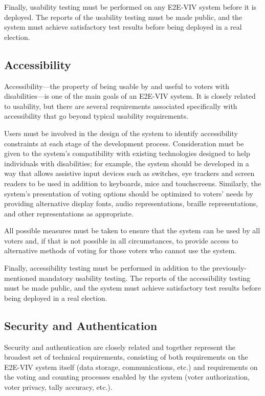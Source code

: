 Finally, usability testing must be performed on any E2E-VIV system
before it is deployed. The reports of the usability testing must be
made public, and the system must achieve satisfactory test results
before being deployed in a real election.

\subsection{Accessibility}

Accessibility---the property of being usable by and useful to voters
with disabilities---is one of the main goals of an E2E-VIV system. It
is closely related to usability, but there are several requirements
associated specifically with accessibility that go beyond typical
usability requirements.

Users must be involved in the design of the system to identify
accessibility constraints at each stage of the development
process. Consideration must be given to the system's compatibility
with existing technologies designed to help individuals with
disabilities; for example, the system should be developed in a way
that allows assistive input devices such as switches, eye trackers and
screen readers to be used in addition to keyboards, mice and
touchscreens. Similarly, the system's presentation of voting options
should be optimized to voters' needs by providing alternative display
fonts, audio representations, braille representations, and other
representations as appropriate.

All possible measures must be taken to ensure that the system can be
used by all voters and, if that is not possible in all circumstances,
to provide access to alternative methods of voting for those voters
who cannot use the system.

Finally, accessibility testing must be performed in addition to the
previously-mentioned mandatory usability testing. The reports of the
accessibility testing must be made public, and the system must achieve
satisfactory test results before being deployed in a real election.

\subsection{Security and Authentication}

Security and authentication are closely related and together represent
the broadest set of technical requirements, consisting of both
requirements on the E2E-VIV system itself (data storage,
communications, etc.) and requirements on the voting and counting
processes enabled by the system (voter authorization, voter privacy,
tally accuracy, etc.).

